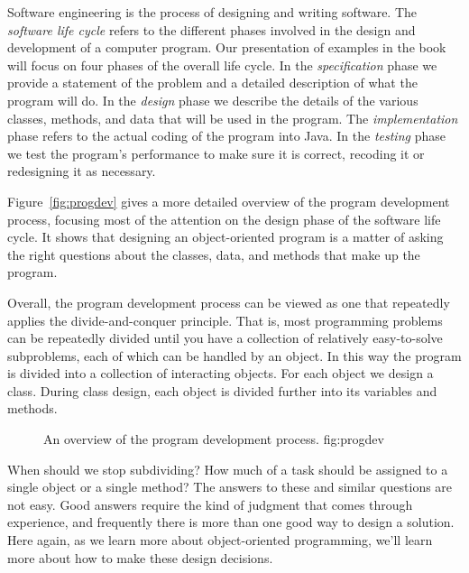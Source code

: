\noindent Software engineering is the process of designing
and writing software.  The {\it software life cycle} refers to the
different phases involved in the design and development of a computer
program.  Our presentation of examples in the book will focus on four
phases of the overall life cycle. In the {\em specification} phase we
provide a statement of the problem and a detailed description of what
the program will do. In the {\em design} phase we describe the details
of the various classes, methods, and data that will be used in the
program. The {\em implementation} phase refers to the actual coding of
the program into Java.  In the {\em testing} phase we test the
program's performance to make sure it is correct, recoding it or
redesigning it as necessary.

Figure~\ref{fig:progdev} gives a more detailed overview of the program
development process, focusing most of the attention on the design
phase of the software life cycle. It shows that designing an
object-oriented program is a matter of asking the right questions
about the classes, data, and methods that make up the program. 

Overall, the program development process can be viewed as one that
repeatedly applies the divide-and-conquer principle.  That is, most
programming problems can be repeatedly divided until you have a
collection of relatively easy-to-solve subproblems, each of which can
be handled by an object. In this way the program is
divided into a collection of interacting objects. For each object we
design a class. During class design, each object is divided further
into its variables and methods.

\begin{figure}[h]
%
{An overview of the program development process.}
{fig:progdev}
\end{figure}

When should we stop subdividing? How much of a task should be assigned
to a single object or a single method?  The answers to these and
similar questions are not easy.  Good answers require the kind of 
judgment that comes through experience, and frequently there is more
than one good way to design a solution.  Here again, as we learn more
about object-oriented programming, we'll learn more about how to make
these design decisions.

